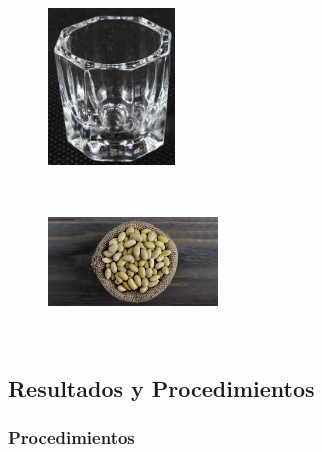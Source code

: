     \begin{figure}[H]
	\begin{center}
 		\includegraphics[width = 0.3\textwidth]{Imagenes/vaso.jpg}
	\end{center} 
    \end{figure}
    \begin{figure}[H]
	\begin{center}
 		\includegraphics[width = 0.4\textwidth]{Imagenes/frijoles.jpeg}
	\end{center} 
    \end{figure}

\subsection{Resultados y Procedimientos}



\subsubsection{Procedimientos}

